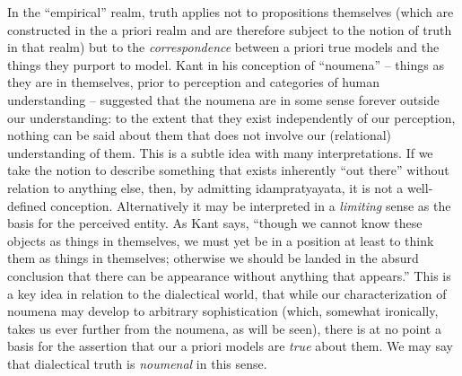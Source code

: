 \documentclass[pra,twocolumn,groupedaddress,10pt]{revtex4}
\theoremstyle{definition}
\begin{document}
In the ``empirical'' realm, truth applies not to propositions themselves (which are constructed in the a priori realm and are therefore subject to the notion of truth in that realm) but to the \emph{correspondence} between a priori true models and the things they purport to model. Kant in his conception of ``noumena'' -- things as they are in themselves, prior to perception and categories of human understanding -- suggested that the noumena are in some sense forever outside our understanding: to the extent that they exist independently of our perception, nothing can be said about them that does not involve our (relational) understanding of them. This is a subtle idea with many interpretations. If we take the notion to describe something that exists inherently ``out there'' without relation to anything else, then, by admitting idampratyayata, it is not a well-defined conception. Alternatively it may be interpreted in a \emph{limiting} sense as the basis for the perceived entity. As Kant says, ``though we cannot know these objects as things in themselves, we must yet be in a position at least to think them as things in themselves; otherwise we should be landed in the absurd conclusion that there can be appearance without anything that appears.''\cite{kant} This is a key idea in relation to the dialectical world, that while our characterization of noumena may develop to arbitrary sophistication (which, somewhat ironically, takes us ever further from the noumena, as will be seen), there is at no point a basis for the assertion that our a priori models are \emph{true} about them. We may say that dialectical truth is \emph{noumenal} in this sense.
\end{document}
